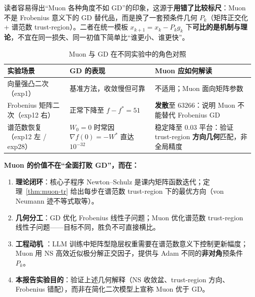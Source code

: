 读者容易得出``Muon 各种角度不如 GD''的印象，这源于\textbf{用错了比较标尺}：Muon 不是 Frobenius 意义下的 GD 替代品，而是换了一套预条件几何 $P_k$（矩阵正交化 + 谱范数 trust-region）。二者在统一模板 $x_{k+1}=x_k-P_k g_k$ 下\textbf{可比的是机制与理论}，不宜在同一损失、同一初值下简单比``谁更小、谁更快''。

\begin{table}[H]
  \centering
  \caption{Muon 与 GD 在不同实验中的角色对照}
  \label{tab:muon-gd-roles}
  \small
  \begin{tabularx}{\textwidth}{@{}lXX@{}}
    \toprule
    实验场景 & GD 的表现 & Muon 应如何解读 \\
    \midrule
    向量强凸二次（exp1） & 基准方法，收敛慢但可靠 & 不适用；Muon 面向矩阵参数 \\
    Frobenius 矩阵二次（exp12 右） & 正常下降至 $f-f^*=51$ & \textbf{发散}至 $63266$：说明 Muon 不能替代 Frobenius GD \\
    谱范数恢复（exp12 左 / exp28） & $W_0{=}0$ 时常因 $\nabla f(0){=}{-}W^*$ 直达 $10^{-32}$ & 稳定降至 $0.03$ 平台：验证 trust-region \textbf{方向几何}匹配，非全局精度 \\
    \bottomrule
  \end{tabularx}
\end{table}

\noindent\textbf{Muon 的价值不在``全面打败 GD''，而在：}
\begin{enumerate}[nosep]
  \item \textbf{理论闭环}：核心子程序 Newton--Schulz 是课内矩阵函数迭代；定理~\ref{thm:muon-tr} 给出每步在谱范数 trust-region 下的最优方向（von Neumann 迹不等式取等）。
  \item \textbf{几何分工}：GD 优化 Frobenius 线性子问题；Muon 优化谱范数 trust-region 线性子问题——目标不同，胜负不可直接横比。
  \item \textbf{工程动机} \cite{jordan2024muon,kovalev2025}：LLM 训练中矩阵型隐层权重需要在谱范数意义下控制更新幅度；Muon 用 NS 高效近似极分解正交因子，提供与 Adam 不同的\textbf{非对角}预条件 $P_k$。
  \item \textbf{本报告实验目的}：验证上述几何解释（NS 收敛盆、trust-region 方向、Frobenius 错配），而非在简化二次模型上宣称 Muon 优于 GD。
\end{enumerate}

